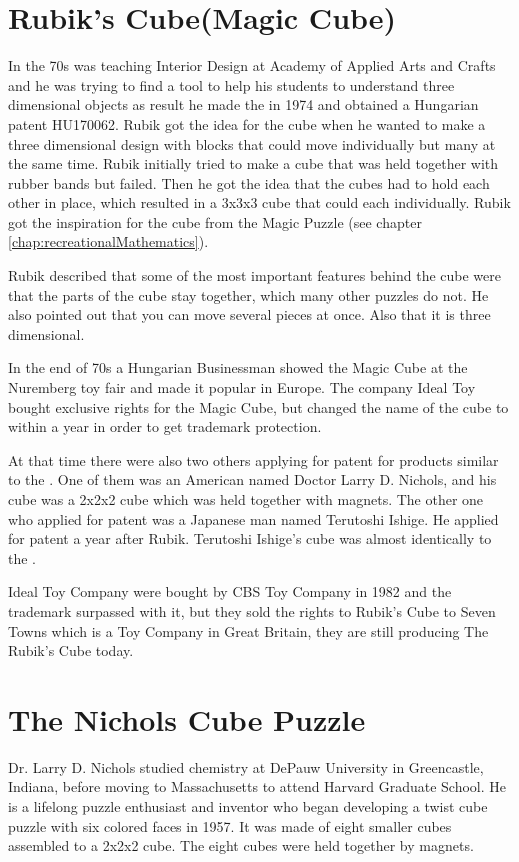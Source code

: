 \section{Rubik's Cube(Magic Cube)}
In the 70s \erno{} was teaching Interior Design at Academy of Applied Arts and Crafts and he was trying to find a tool to help his students to understand three dimensional objects as result he made the \mcube in 1974 and obtained a Hungarian patent HU170062. 
Rubik got the idea for the cube when he wanted to make a three dimensional design with blocks that could move individually but many at the same time. Rubik initially tried  to make a cube that was held together with rubber bands but failed. Then he got the idea that the cubes had to hold each other in place, which resulted in a 3x3x3 cube that could \twist{} each \face{} individually. Rubik got the inspiration for the cube from the Magic Puzzle (see chapter \ref{chap:recreationalMathematics}).

Rubik described that some of the most important features behind the cube were that the parts of the cube stay together, which many other puzzles do not. He also pointed out that you can move several pieces at once. Also that it is three dimensional. 

In the end of 70s a Hungarian Businessman showed the Magic Cube at the Nuremberg toy fair and made it popular in Europe. The company Ideal Toy bought exclusive rights for the Magic Cube, but changed the name of the cube to \rubik{} within a year in order to get trademark protection.

At that time there were also two others applying for patent for products similar to the \rubik{}.  One of them was an American named Doctor Larry D. Nichols, and his cube was a 2x2x2 cube which was held together with magnets. The other one who applied for patent was a Japanese man named Terutoshi Ishige. He applied for patent a year after Rubik. Terutoshi Ishige's cube was almost identically to the \rubik{}.

Ideal Toy Company were bought by CBS Toy Company in 1982 and the trademark surpassed with it, but they sold the rights to Rubik's Cube to Seven Towns which is a Toy Company in Great Britain, they are still producing The Rubik's Cube today.
\section{The Nichols Cube Puzzle}
Dr. Larry D. Nichols studied chemistry at DePauw University in Greencastle, Indiana, before moving to Massachusetts to attend Harvard Graduate School. 
He is a lifelong puzzle enthusiast and inventor who  began developing a twist cube puzzle with six colored faces in 1957. It was made of eight smaller cubes assembled to a 2x2x2 cube. The eight cubes were held together by magnets.


